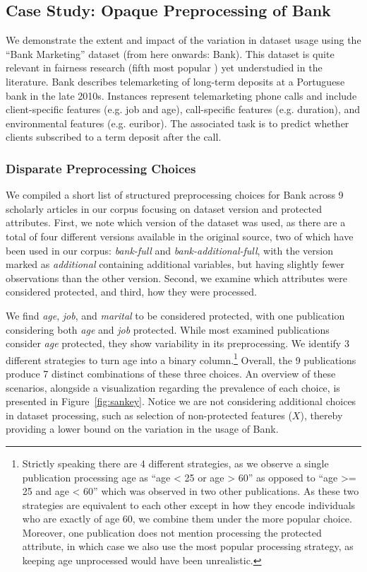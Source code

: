 \subsection*{Case Study: Opaque Preprocessing of Bank}
We demonstrate the extent and impact of the variation in dataset usage using the ``Bank Marketing'' dataset \citep{moro2014data} (from here onwards: Bank). This dataset is quite relevant in fairness research (fifth most popular \citep{fabris2022algorithmic}) yet understudied in the literature. Bank describes telemarketing of long-term deposits at a Portuguese bank in the late 2010s. Instances represent telemarketing phone calls and include client-specific features (e.g. job and age), call-specific features (e.g. duration), and environmental features (e.g. euribor). The associated task is to predict whether clients subscribed to a term deposit after the call.

\subsubsection*{Disparate Preprocessing Choices}

We compiled a short list of structured preprocessing choices for Bank across 9 scholarly articles in our corpus focusing on dataset version and protected attributes. First, we note which version of the dataset was used, as there are a total of four different versions available in the original source, two of which have been used in our corpus: \textit{bank-full} and \textit{bank-additional-full}, with the version marked as \textit{additional} containing additional variables, but having slightly fewer observations than the other version. Second, we examine which attributes were considered protected, and third, how they were processed. 

We find \textit{age}, \textit{job}, and \textit{marital} to be considered protected, with one publication considering both \textit{age} and \textit{job} protected. While most examined publications consider \textit{age} protected, they show variability in its preprocessing. We identify 3 different strategies to turn age into a binary column.\footnote{Strictly speaking there are 4 different strategies, as we observe a single publication processing age as ``age < 25 or age > 60'' as opposed to ``age >= 25 and age < 60'' which was observed in two other publications. As these two strategies are equivalent to each other except in how they encode individuals who are exactly of age 60, we combine them under the more popular choice. Moreover, one publication does not mention processing the protected attribute, in which case we also use the most popular processing strategy, as keeping age unprocessed would have been unrealistic.} Overall, the 9 publications produce 7 distinct combinations of these three choices. An overview of these scenarios, alongside a visualization regarding the prevalence of each choice, is presented in Figure~\ref{fig:sankey}. Notice we are not considering additional choices in dataset processing, such as selection of non-protected features ($X$), thereby providing a lower bound on the variation in the usage of Bank.

